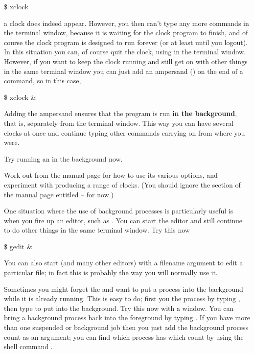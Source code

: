 \begin{ttoutenv}
\$ xclock\return
\end{ttoutenv}
a clock does indeed appear. However, you then can't type any more
commands in the terminal window, because it is waiting for the
clock program to finish, and of course the clock program is designed
to run forever (or at least until you logout). In this situation you can, of course quit the clock, using   in the terminal window. However, if you want to keep the clock running and still get on with other things in the same terminal window you can just add an ampersand (\ttout{\&}) on the end of a command, so in this case,
\begin{ttoutenv}
\$ xclock \&
\end{ttoutenv}
Adding the ampersand ensures that the program is run \textbf{in the
   background}, that is, separately from the terminal window.
 This way you can have several clocks at once and continue typing
 other commands carrying on from where you were.

Try running an  in the background now.

Work out from the manual page for  how to use its various options, and experiment with producing a range of clocks.
(You should ignore the section of the manual page entitled  -- for now.)


One situation where the use of background processes is particularly useful is when you fire up an editor, such as . You can start the editor and still continue to do other things in the same terminal window. Try this now
\begin{ttoutenv}
\$ gedit \&
\end{ttoutenv}
You can also start  (and many other editors) with a filename argument to edit a particular file; in fact this is probably the way you will normally use it.

Sometimes you might forget the \ttout{\&} and want to put a process into the background while it is already running. This is easy to do; first you  the process by typing , then type  to put into the background. Try this now with a  window.  You can bring a background process back into the foreground by typing . If you have more than one suspended or background job then you just add the background process count as an argument; you can find which process has which count by using the shell command .

